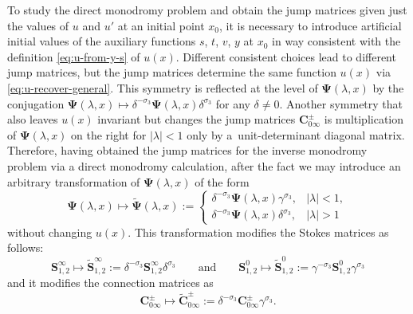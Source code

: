 \documentclass[11pt]{article}
\numberwithin{equation}{section}
\numberwithin{equation}{section}
\begin{document}
To study the direct monodromy problem and obtain the jump matrices given just the values of $u$ and $u'$ at an initial point $x_0$, it is necessary to introduce artificial initial values of the auxiliary functions $s$, $t$, $v$, $y$ at $x_0$ in way consistent with the definition \eqref{eq:u-from-y-s} of $u(x)$. Different consistent choices lead to different jump matrices, but the jump matrices determine the same function $u(x)$ via \eqref{eq:u-recover-general}. This symmetry is reflected at the level of $\mathbf{\Psi}(\lambda,x)$ by the conjugation
 $\mathbf{\Psi}(\lambda,x)\mapsto \delta^{-\sigma_3}\mathbf{\Psi}(\lambda,x)\delta^{\sigma_3}$
 for any $\delta\neq 0$. Another symmetry that also leaves $u(x)$ invariant but changes the jump matrices $\mathbf{C}_{0\infty}^\pm$ is multiplication of $\mathbf{\Psi}(\lambda,x)$ on the right for $|\lambda|<1$ only by a~unit-determinant diagonal matrix. Therefore, having obtained the jump matrices for the inverse monodromy problem via a direct monodromy calculation, after the fact we may introduce an arbitrary transformation of $\mathbf{\Psi}(\lambda,x)$ of the form
\begin{equation}\label{eq:transf}
 \boldsymbol \Psi(\lambda,x)\mapsto \widetilde{\mathbf{\Psi}}(\lambda,x):=\begin{cases}
 \delta^{-\sigma_3} \boldsymbol \Psi(\lambda,x)\gamma^{\sigma_3},&|\lambda|<1,\\
 \delta^{-\sigma_3}\boldsymbol \Psi(\lambda,x)\delta^{\sigma_3},&|\lambda|>1
 \end{cases}
\end{equation}
without changing $u(x)$. This transformation modifies the Stokes matrices as follows:
 \begin{equation}\label{eq:stokes-transformation}
 \mathbf{S}^\infty_{1,2}\mapsto \widetilde{\mathbf{S}}^\infty_{1,2}:=\delta^{-\sigma_3}\mathbf{S}^\infty_{1,2}\delta^{\sigma_3}\qquad\text{and}\qquad
 \mathbf{S}^0_{1,2}\mapsto \widetilde{\mathbf{S}}^0_{1,2}:=\gamma^{-\sigma_3}\mathbf{S}^0_{1,2}\gamma^{\sigma_3}
 \end{equation}
 and it modifies the connection matrices as
 \begin{equation}
 \mathbf{C}_{0\infty}^\pm\mapsto\widetilde{\mathbf{C}}_{0\infty}^\pm:=\delta^{-\sigma_3}\mathbf{C}_{0\infty}^\pm\gamma^{\sigma_3}.
 \label{eq:connection-modify}
 \end{equation}
\end{document}
